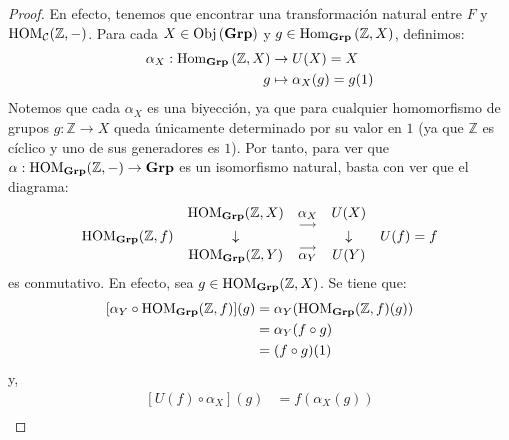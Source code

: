 \documentclass[12pt]{report}
\newcounter{it}
\theoremstyle{largebreak}
\newcommand\cf[3]{\ensuremath{#1:#2\rightarrow#3}}
\newcommand{\Obj}[1]{\ensuremath{\textup{Obj}\left(#1\right)}}
\newcommand{\Hom}[3]{\ensuremath{\textup{Hom}_{#1}\left(#2,#3\right)}}
\newcommand{\Cat}[1]{\ensuremath{\textup{\textbf{#1}}}}
\begin{document}
    \begin{proof}
        En efecto, tenemos que encontrar una transformación natural entre $F$ y $\textup{HOM}_{\mathcal{C}}(\mathbb{Z},-)$. Para cada $X\in\Obj{\Cat{Grp}}$ y $g\in\Hom{\Cat{Grp}}{\mathbb{Z}}{X}$, definimos:
        \begin{equation*}
            \begin{split}
                \alpha_X:\Hom{\Cat{Grp}}{\mathbb{Z}}{X}&\rightarrow U(X)=X\\
                g&\mapsto\alpha_X(g)=g(1)\\
            \end{split}
        \end{equation*}
        Notemos que cada $\alpha_X$ es una biyección, ya que para cualquier homomorfismo de grupos $\cf{g}{\mathbb{Z}}{X}$ queda únicamente determinado por su valor en $1$ (ya que $\mathbb{Z}$ es cíclico y uno de sus generadores es $1$). Por tanto, para ver que $\cf{\alpha}{\HOM{\Cat{Grp}}(\mathbb{Z},-)}{\Cat{Grp}}$ es un isomorfismo natural, basta con ver que el diagrama:
        \begin{equation*}
            \begin{array}{rcccl}
                & \HOM{\Cat{Grp}}(\mathbb{Z},X) & \underset{\longrightarrow}{\alpha_{X}} & U(X) &\\
                \HOM{\Cat{Grp}}(\mathbb{Z},f) & \downarrow & & \downarrow & U(f)=f \\
                & \HOM{\Cat{Grp}}(\mathbb{Z},Y) & \overset{\longrightarrow}{\alpha_{Y}} & U(Y) &\\
            \end{array}
        \end{equation*}
        es conmutativo. En efecto, sea $g\in\HOM{\Cat{Grp}}(\mathbb{Z},X)$. Se tiene que:
        \begin{equation*}
            \begin{split}
                [\alpha_Y\circ\HOM{\Cat{Grp}}(\mathbb{Z},f)](g)&=\alpha_Y(\HOM{\Cat{Grp}}(\mathbb{Z},f)(g))\\
                &=\alpha_Y(f\circ g)\\
                &=(f\circ g)(1)\\
            \end{split}
        \end{equation*}
        y,
        \begin{equation*}
            \begin{split}
                [U(f)\circ \alpha_X](g)&=f(\alpha_X(g))\\

\end{split}
\end{equation*}
\end{proof}
\end{document}
